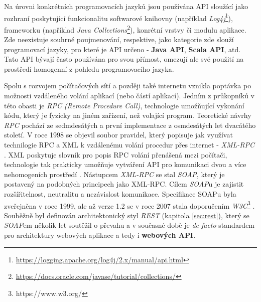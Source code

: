 Na úrovni konkrétních programovacích jazyků jsou používána API sloužící jako rozhraní poskytující funkcionalitu softwarové knihovny (například \textit{Log4j}\footnote{\url{https://logging.apache.org/log4j/2.x/manual/api.html}}), frameworku (například \textit{Java Collections}\footnote{\url{https://docs.oracle.com/javase/tutorial/collections/}}), konrétní vrstvy či modulu aplikace. Zde neexistuje souhrné poujmenování, respektive, jako kategorie zde slouží programovací jazyky, pro které je API určeno - \textbf{Java API}, \textbf{Scala API}, atd. Tato API bývají často používána pro svou přímost, omezují ale své použití na prostředí homogenní z pohledu programovacího jazyka.

Spolu s rozvojem počítačových sítí a později také internetu vznikla poptávka po možnosti vzdáleného volání aplikací (nebo částí aplikací). Jedním z průkopníků v této obasti je \textit{RPC (Remote Procedure Call)}, technologie umožňující vykonání kódu, který je fyzicky na jiném zařízení, než volající program. Teoretické návrhy \textit{RPC} pochází ze sedmdesátých a první implementace z osmdesátých let dvacátého století. V roce 1998 se objevil soubor pravidel, který popisuje jak využívat technilogie RPC a XML k vzdálenému volání procedur přes internet - \textit{XML-RPC} \cite{Winner99}. XML poskytuje slovník pro popis RPC volání přenášená mezi počítači, technologie tak prakticky umožňuje vytváření API pro komunikaci dvou a více nehomogeních prostředí \cite{Laurent01}. Nástupcem \textit{XML-RPC} se stal \textit{SOAP}, který je postavený na podobných principech jako XML-RPC. Cílem \textit{SOAP}u je zajistit rozšířitelnost, neutralitu a nezávislost komunikace. Specifikace SOAPu byla zveřejněna v roce 1999, ale až verze 1.2 se v roce 2007 stala doporučením \textit{W3C}\footnote{https://www.w3.org/} \cite{W3C07}. Souběžně byl definován architektonický styl \textit{REST} (kapitola \ref{sec:rest}), který se \textit{SOAP}em několik let soutěžil o převahu a v současné době je \textit{de-facto} standardem pro architektury webových aplikace a tedy i \textbf{webových API}.

